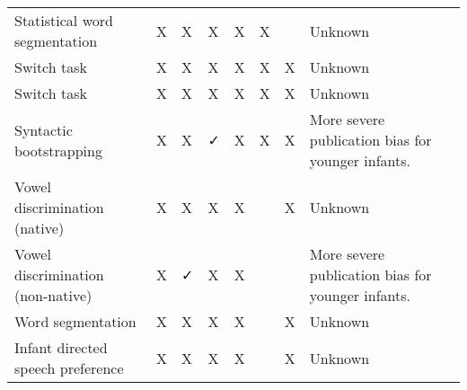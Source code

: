 \documentclass[
]{article}
\begin{document}
\begin{tabular}{llllllll}
Statistical word segmentation & X & X & X & X & X &  & Unknown\\
Switch task & X & X & X & X & X & X & Unknown\\
\addlinespace
Switch task & X & X & X & X & X & X & Unknown\\
Syntactic bootstrapping & X & X & ✓ & X & X & X & More severe publication bias for younger infants.\\
Vowel discrimination (native) & X & X & X & X &  & X & Unknown\\
Vowel discrimination (non-native) & X & ✓ & X & X &  &  & More severe publication bias for younger infants.\\
Word segmentation & X & X & X & X &  & X & Unknown\\
\addlinespace
Infant directed speech preference & X & X & X & X &  & X & Unknown\\
\bottomrule
\end{tabular}
\endgroup{}
\end{document}
